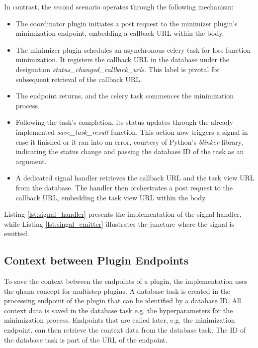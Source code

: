 \documentclass[
  a4paper,  %
  twoside,  %
  bibliography=totoc,
  headsepline,
  cleardoublepage=empty,
  parskip=half,
  draft=false
]{scrbook}
\begin{document}
In contrast, the second scenario operates through the following mechanism:
\begin{itemize}
    \item The coordinator plugin initiates a post request to the minimizer plugin's minimization endpoint, embedding a callback URL within the body.
    \item The minimizer plugin schedules an asynchronous celery task for loss function minimization.
    It registers the callback URL in the database under the designation \emph{status\_changed\_callback\_urls}.
    This label is pivotal for subsequent retrieval of the callback URL.
    \item The endpoint returns, and the celery task commences the minimization process.
    \item Following the task's completion, its status updates through the already implemented \emph{save\_task\_result} function.
    This action now triggers a signal in case it finished or it ran into an error, courtesy of Python's \emph{blinker} library, indicating the status change and passing the database ID of the task as an argument.
    \item A dedicated signal handler retrieves the callback URL and the task view URL from the database.
    The handler then orchestrates a post request to the callback URL, embedding the task view URL within the body.
\end{itemize}
Listing \ref{lst:signal_handler} presents the implementation of the signal handler, while Listing \ref{lst:singal_emitter} illustrates the juncture where the signal is emitted.






\subsection{Context between Plugin Endpoints}
\label{sec:contextBetweenPluginEndpoints}
To save the context between the endpoints of a plugin, the implementation uses the \gls{qhana} concept for multistep plugins.
A database task is created in the processing endpoint of the plugin that can be identified by a database ID.
All context data is saved in the database task e.g. the hyperparameters for the minimization process.
Endpoints that are called later, e.g. the minimization endpoint, can then retrieve the context data from the database task.
The ID of the database task is part of the URL of the endpoint.
\end{document}
